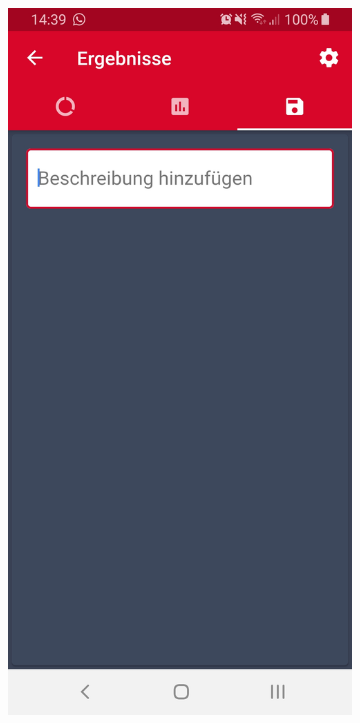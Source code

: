	\begin{figure}[H]
		\centering
		\begin{subfigure}[b]{0.45\textwidth}
			\centering
			\includegraphics[width=1\textwidth]{../include/images/usertests/commentTextfield/before}

\end{subfigure}
\end{figure}
